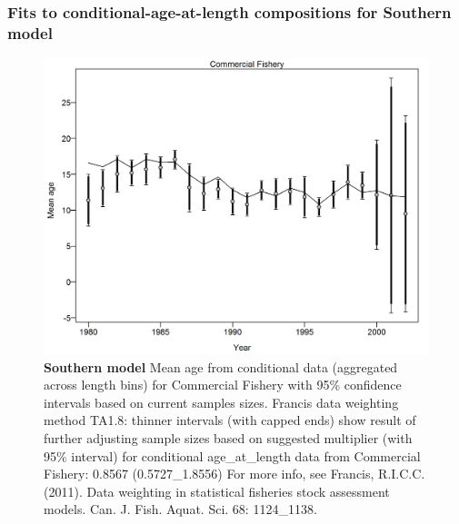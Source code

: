 \documentclass[12pt,]{article}
\begin{document}
\FloatBarrier

\newpage

\subsubsection{Fits to conditional-age-at-length compositions for
Southern
model}\label{fits-to-conditional-age-at-length-compositions-for-southern-model}

\begin{figure}[htbp]
\centering
\includegraphics{./r4ss/plots_mod2/comp_condAALfit_data_weighting_TA1.8_condAgeCommercial Fishery.png}
\caption{\textbf{Southern model} Mean age from conditional data
(aggregated across length bins) for Commercial Fishery with 95\%
confidence intervals based on current samples sizes. Francis data
weighting method TA1.8: thinner intervals (with capped ends) show result
of further adjusting sample sizes based on suggested multiplier (with
95\% interval) for conditional age\_at\_length data from Commercial
Fishery: 0.8567 (0.5727\_1.8556) For more info, see Francis, R.I.C.C.
(2011). Data weighting in statistical fisheries stock assessment models.
Can. J. Fish. Aquat. Sci. 68: 1124\_1138.
\label{fig:mod2_4_comp_condAALfit_data_weighting_TA1.8_condAgeCommercial Fishery}}
\end{figure}
\end{document}
